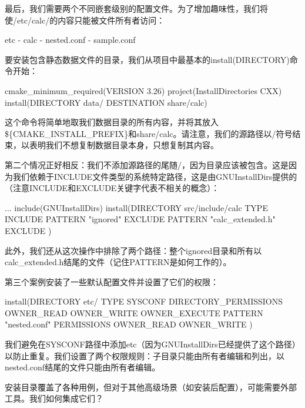 最后，我们需要两个不同嵌套级别的配置文件。为了增加趣味性，我们将使/etc/calc/的内容只能被文件所有者访问：

\begin{shell}
etc
- calc
  - nested.conf
- sample.conf
\end{shell}

要安装包含静态数据文件的目录，我们从项目中最基本的install(DIRECTORY)命令开始：


\begin{cmake}
cmake_minimum_required(VERSION 3.26)
project(InstallDirectories CXX)
install(DIRECTORY data/ DESTINATION share/calc)
\end{cmake}

这个命令将简单地取我们数据目录的所有内容，并将其放入\$\{CMAKE\_INSTALL\_PREFIX\}和share/calc。请注意，我们的源路径以/符号结束，以表明我们不想复制数据目录本身，只想复制其内容。

第二个情况正好相反：我们不添加源路径的尾随/，因为目录应该被包含。这是因为我们依赖于INCLUDE文件类型的系统特定路径，这是由GNUInstallDirs提供的（注意INCLUDE和EXCLUDE关键字代表不相关的概念）：


\begin{cmake}
...
include(GNUInstallDirs)
install(DIRECTORY src/include/calc TYPE INCLUDE
    PATTERN "ignored" EXCLUDE
    PATTERN "calc_extended.h" EXCLUDE
)
\end{cmake}

此外，我们还从这次操作中排除了两个路径：整个ignored目录和所有以calc\_extended.h结尾的文件（记住PATTERN是如何工作的）。

第三个案例安装了一些默认配置文件并设置了它们的权限：


\begin{cmake}
install(DIRECTORY etc/ TYPE SYSCONF
    DIRECTORY_PERMISSIONS
        OWNER_READ OWNER_WRITE OWNER_EXECUTE
    PATTERN "nested.conf"
        PERMISSIONS OWNER_READ OWNER_WRITE
)
\end{cmake}

我们避免在SYSCONF路径中添加etc（因为GNUInstallDirs已经提供了这个路径）以防止重复。我们设置了两个权限规则：子目录只能由所有者编辑和列出，以nested.conf结尾的文件只能由所有者编辑。

安装目录覆盖了各种用例，但对于其他高级场景（如安装后配置），可能需要外部工具。我们如何集成它们？


